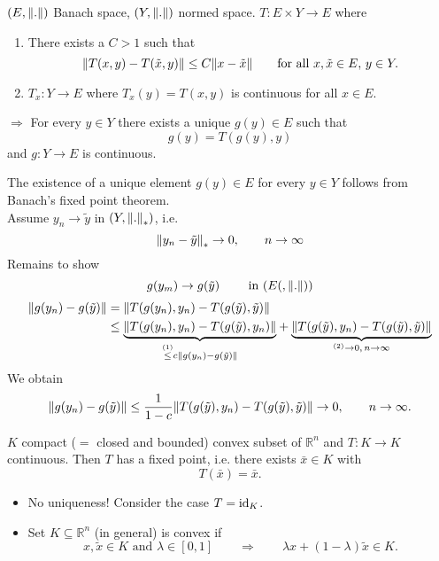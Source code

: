 


\begin{theorem}
	$(E,\norm{.})$ Banach space, $(Y,\norm{.})$ normed space. $T: E \times Y \to E$ where
	\begin{enumerate}[(1)]
		\item There exists a $C > 1$ such that
		\[
			\norm{T(x,y)-T(\tilde x,y)} \leq C \norm{x - \tilde x} \qquad \text{for all }x, \tilde x \in E,\, y \in Y.
		\]
		\item $T_x: Y \to E$ where $T_x(y)= T(x,y)$ is continuous for all $x \in E$.
	\end{enumerate}
	$\Rightarrow $ For every $y \in Y$ there exists a unique $g(y) \in E$ such that \[
		g(y)= T(g(y),y)
	\] and $g: Y \to E$ is continuous.
\end{theorem}
\begin{beweis}
	The existence of a unique element $g(y) \in E$ for every $y \in Y$ follows from Banach's fixed point theorem. \\
	Assume $y_n \to \tilde y$ in $(Y, \norm{.}_{*})$, i.e. \[
		\norm{y_n - \tilde y}_* \to 0, \qquad n \to \infty
	\]
	Remains to show
	\[
		g(y_m) \to g(\tilde y) \qquad \text{ in }(E(,\norm{.}))
	\]
	\begin{align*}
		\norm{g(y_n)- g( \tilde y)} &= \norm{T(g(y_n),y_n) - T(g(\tilde y), \tilde y)} \\
		&\leq  \underset{ \stackrel{(1)}{\leq } c \norm{g(y_n)-g(\tilde y)}}{\underbrace{\norm{T(g(y_n),y_n) - T(g( \tilde y),y_n)}}} + 
		\underset{^{(2)}\to 0, \, n \to \infty}{\underbrace{\norm{T(g(\tilde y),y_n)- T(g(\tilde y),\tilde y)}}}
	\end{align*}
	We obtain
	\[
		\norm{g(y_n)-g(\tilde y)} \leq \frac{1}{1-c} \norm{T(g(\tilde y), y_n) - T(g(\tilde y),\tilde y)} \to 0, \qquad n \to \infty.
	\]
\end{beweis}

\begin{theorem}
	$K$ compact ($=$ closed and bounded) convex subset of $\mathbb{R}^n$ and $T: K \to K$ continuous. Then $T$ has a fixed point, i.e. there exists $\bar{x} \in K$ with
	\[
		T(\bar{x}) = \bar{x}.
	\]
\end{theorem}
\begin{bemerkung}
	\begin{itemize}
		\item No uniqueness! Consider the case $T= \operatorname{id}_K$.
		\item Set $K \subseteq \mathbb{R}^n$ (in general) is convex if
		\[
			x, \tilde x \in K \text{ and } \lambda \in [0,1] \qquad \Rightarrow \qquad \lambda x + ( 1- \lambda)\tilde x \in K.
		\]
	\end{itemize}
\end{bemerkung}

